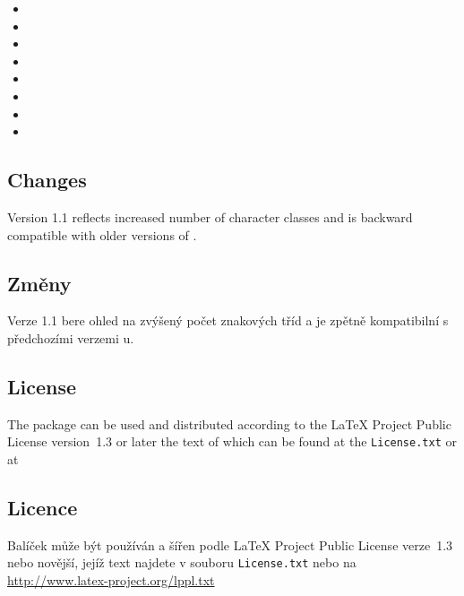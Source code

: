 \fi

\begin{itemize}
\item {}
\item {}
\item {}
\item {}
\item {}
\item {}
\item {}
\item {}
\end{itemize}


\ifeng
\subsection{Changes}
Version 1.1 reflects increased number of character classes and is backward compatible with older
versions of \XeTeX.
\else

\subsection{Změny}
Verze 1.1 bere ohled na zvýšený počet znakových tříd a je zpětně kompatibilní s předchozími verzemi
\XeTeX u.
\fi

\ifeng
\subsection{License}
The package can be used and distributed according to the LaTeX Project Public License version~1.3 or later the
text of which can be found at the \texttt{License.txt} or at
\else

\subsection{Licence}
Balíček může být používán a šířen podle LaTeX Project Public License verze~1.3 nebo novější, jejíž text najdete
v souboru \texttt{License.txt} nebo na
\fi
\url{http://www.latex-project.org/lppl.txt}
